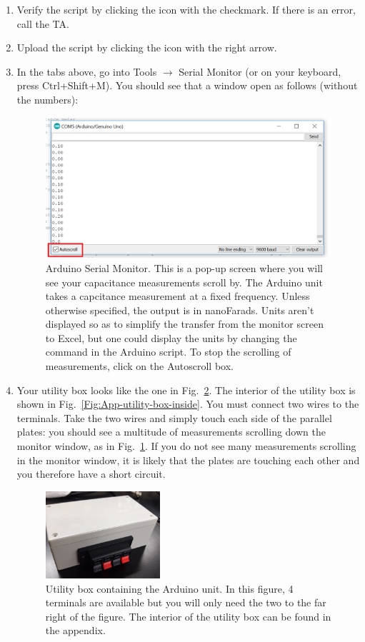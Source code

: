 \documentclass[12pt]{report}
\begin{document}
\begin{enumerate}
\item Verify the script by clicking the icon with the checkmark. If there is an error, call the TA.
\item Upload the script by clicking the icon with the right arrow.
\item In the tabs above, go into Tools $\rightarrow$ Serial Monitor (or on your keyboard, press Ctrl+Shift+M). You should see that a window open as follows (without the numbers):
\begin{figure}[h]
\centering
\includegraphics[width=0.85 \textwidth]{lab1-Arduino-monitor.png}
\caption{Arduino Serial Monitor. This is a pop-up screen where you will see your capacitance measurements scroll by. The Arduino unit takes a capcitance measurement at a fixed frequency. Unless otherwise specified, the output is in nanoFarads. Units aren't displayed so as to simplify the transfer from the monitor screen to Excel, but one could display the units by changing the command in the Arduino script. To stop the scrolling of measurements, click on the Autoscroll box.}
\label{Fig:Arduino-Monitor}
\end{figure}

\item Your utility box looks like the one in Fig.~\ref{Fig:lab1-utility-box}. The interior of the utility box is shown in Fig.~\ref{Fig:App-utility-box-inside}. 
You must connect two wires to the terminals. 
Take the two wires and simply touch each side of the parallel plates: you should see a multitude of measurements scrolling down the monitor window, as in Fig.~\ref{Fig:Arduino-Monitor}. 
If you do not see many measurements scrolling in the monitor window, it is likely that the plates are touching each other and you therefore have a short circuit. 
\begin{figure}[h]
\centering
\includegraphics[width=0.4\textwidth]{lab1-utility-box}
\caption{Utility box containing the Arduino unit. In this figure, 4 terminals are available but you will only need the two to the far right of the figure. The interior of the utility box can be found in the appendix.}
\label{Fig:lab1-utility-box}
\end{figure}


\end{enumerate}
\end{document}
